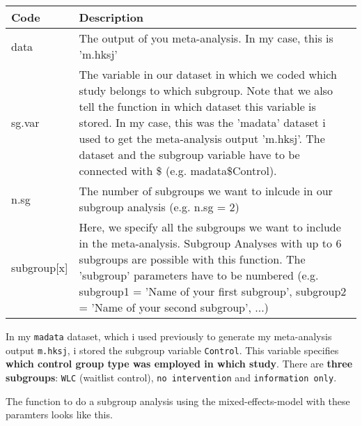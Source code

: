 \documentclass[]{book}
\newenvironment{Shaded}{\begin{snugshade}}{\end{snugshade}}
\newcommand{\KeywordTok}[1]{\textcolor[rgb]{0.13,0.29,0.53}{\textbf{#1}}}
\newcommand{\DataTypeTok}[1]{\textcolor[rgb]{0.13,0.29,0.53}{#1}}
\newcommand{\DecValTok}[1]{\textcolor[rgb]{0.00,0.00,0.81}{#1}}
\newcommand{\StringTok}[1]{\textcolor[rgb]{0.31,0.60,0.02}{#1}}
\newcommand{\OperatorTok}[1]{\textcolor[rgb]{0.81,0.36,0.00}{\textbf{#1}}}
\newcommand{\NormalTok}[1]{#1}
\theoremstyle{definition}
\theoremstyle{definition}
\theoremstyle{definition}
\theoremstyle{remark}
\begin{document}
\begin{tabular}{l|l}
\hline
Code & Description\\
\hline
data & The output of you meta-analysis. In my case, this is 'm.hksj'\\
\hline
sg.var & The variable in our dataset in which we coded which study belongs to which subgroup. Note that we also tell the function in which dataset this variable is stored. In my case, this was the 'madata' dataset i used to get the meta-analysis output 'm.hksj'. The dataset and the subgroup variable have to be connected with \$ (e.g. madata\$Control).\\
\hline
n.sg & The number of subgroups we want to inlcude in our subgroup analysis (e.g. n.sg = 2)\\
\hline
subgroup[x] & Here, we specify all the subgroups we want to include in the meta-analysis. Subgroup Analyses with up to 6 subgroups are possible with this function. The 'subgroup' parameters have to be numbered (e.g. subgroup1 = 'Name of your first subgroup', subgroup2 = 'Name of your second subgroup', ...)\\
\hline
\end{tabular}

In my \texttt{madata} dataset, which i used previously to generate my
meta-analysis output \texttt{m.hksj}, i stored the subgroup variable
\texttt{Control}. This variable specifies \textbf{which control group
type was employed in which study}. There are \textbf{three subgroups}:
\texttt{WLC} (waitlist control), \texttt{no\ intervention} and
\texttt{information\ only}.

The function to do a subgroup analysis using the mixed-effects-model
with these paramters looks like this.

\begin{Shaded}
\end{Shaded}
\end{document}
